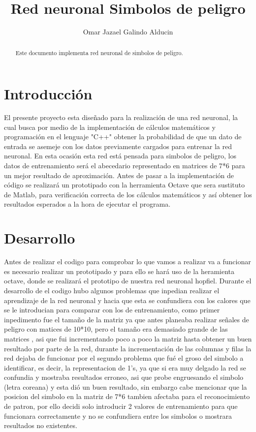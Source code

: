\documentclass[10pt]{article}         %
\title{Red neuronal Simbolos de peligro}
\author{Omar Jazael Galindo Alducin}
\begin{document}
\maketitle

\begin{abstract}
Este documento implementa red neuronal de simbolos de peligro.
\end{abstract}

\section{Introducción}
El presente proyecto esta diseñado para la realización de una red neuronal, la cual busca por medio de la implementación de cálculos matemáticos y programación en el lenguaje "C++" obtener la probabilidad de que un dato de entrada se asemeje con los datos previamente cargados para entrenar la red neuronal.
En esta ocasión esta red está pensada para simbolos de peligro, los datos de entrenamiento será el abecedario representado en matrices de 7*6 para un mejor resultado de aproximación.
Antes de pasar a la implementación de código se realizará un prototipado con la herramienta Octave que sera sustituto de Matlab, para verificación correcta de los cálculos matemáticos y así obtener los resultados esperados a la hora de ejecutar el programa.

\section{Desarrollo}

Antes de realizar el codigo para comprobar lo que vamos a realizar va a funcionar es necesario realizar un prototipado y para ello se hará uso de la heramienta octave, donde se realizará el prototipo de nuestra red neuronal hopfiel.
Durante el desarrollo de el codigo hubo algunos problemas que inpedian realizar el aprendizaje de la red neuronal y hacia que esta se confundiera con los calores que se le introducian para comparar con los de entrenamiento, como primer inpedimento fue el tamaño de la matriz ya que antes planeaba realizar señales de peligro con matices de 10*10, pero el tamaño era demasiado grande de las matrices , asi que fui incrementando poco a poco la matriz hasta obtener un buen resultado por parte de la red, durante la incrementación de las columnas y filas la red dejaba de funcionar por el segundo problema que fué el groso del simbolo a identificar, es decir, la representacion de 1's, ya que si era muy delgado la red se confundia y mostraba resultados erroneo, asi que probe engruesando el simbolo (letra coreana) y esta dió un buen resultado, sin embargo cabe mencionar que la posicion del simbolo en la matriz de 7*6 tambien afectaba para el reconocimiento de patron, por ello decidi solo introducir 2 valores de entrenamiento para que funcionara correctamente y no se confundiera entre los simbolos o mostrara resultados no existentes.
\end{document}
